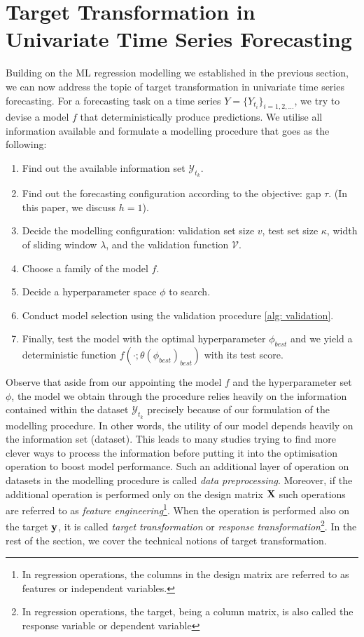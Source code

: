 \section{Target Transformation in Univariate Time Series Forecasting}

Building on the ML regression modelling we established in the previous section, we can now address the topic of target transformation in univariate time series forecasting. For a forecasting task on a time series $Y = \{ Y_{t_i} \}_{i = 1, 2, \ldots}$, we try to devise a model $f$ that deterministically produce predictions. We utilise all information available and formulate a modelling procedure that goes as the following:
\begin{enumerate}
    \item Find out the available information set $\mathcal{Y}_{t_k}$.
    \item Find out the forecasting configuration according to the objective: gap $\tau$. (In this paper, we discuss $h=1$).
    \item Decide the modelling configuration: validation set size $v$, test set size $\kappa$, width of sliding window $\lambda$, and the validation function $\mathcal{V}$.
    \item Choose a family of the model $f$.
    \item Decide a hyperparameter space $\phi$ to search.
    \item Conduct model selection using the validation procedure \ref{alg: validation}.
    \item Finally, test the model with the optimal hyperparameter $\phi_{best}$ and we yield a deterministic function $f(\cdot;\theta(\phi_{best})_{best})$ with its test score.
\end{enumerate}
Observe that aside from our appointing the model $f$ and the hyperparameter set $\phi$, the model we obtain through the procedure relies heavily on the information contained within the dataset $\mathcal{Y}_{t_k}$ precisely because of our formulation of the modelling procedure. In other words, the utility of our model depends heavily on the information set (dataset). This leads to many studies trying to find more clever ways to process the information before putting it into the optimisation operation to boost model performance. Such an additional layer of operation on datasets in the modelling procedure is called \textit{data preprocessing}. Moreover, if the additional operation is performed only on the design matrix $\mathbf{X}$ such operations are referred to as \textit{feature engineering}\footnote{In regression operations, the columns in the design matrix are referred to as features or independent variables.}. When the operation is performed also on the target $\mathbf{y}$, it is called \textit{target transformation} or \textit{response transformation}\footnote{In regression operations, the target, being a column matrix, is also called the response variable or dependent variable}. In the rest of the section, we cover the technical notions of target transformation.


